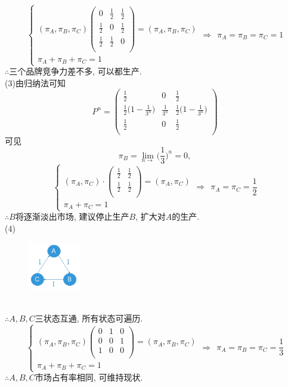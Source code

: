 \[
\begin{cases}
(\pi_A,\pi_B,\pi_C)
\begin{pmatrix}
0 & \frac{1}{2} & \frac{1}{2}\\
\frac{1}{2} & 0 & \frac{1}{2}\\
\frac{1}{2} & \frac{1}{2} & 0\\
\end{pmatrix}
=
(\pi_A,\pi_B,\pi_C)\\
\pi_A+\pi_B+\pi_C = 1
\end{cases}
\Rightarrow~~
\pi_A = \pi_B = \pi_C = 1
\]
$\therefore$三个品牌竞争力差不多, 可以都生产.\\
(3)由归纳法可知
\[
P^n=
\begin{pmatrix}
\frac{1}{2} & 0 & \frac{1}{2}\\
\frac{1}{2}\big(1-\frac{1}{3^n}\big) & \frac{1}{3^n} & \frac{1}{2}\big(1-\frac{1}{3^n}\big)\\
\frac{1}{2} & 0 & \frac{1}{2}\\
\end{pmatrix}
\]
可见
\[
\pi_B = \lim_{n\rightarrow} \Big(\frac{1}{3}\Big)^n = 0,
\]
\[
\begin{cases}
(\pi_A, \pi_C)\cdot 
	\begin{pmatrix}
	\frac{1}{2} & \frac{1}{2}\\
	\frac{1}{2} & \frac{1}{2}\\
	\end{pmatrix}	
=
(\pi_A, \pi_C)\\
\pi_A + \pi_C = 1
\end{cases}
\Rightarrow~~
\pi_A = \pi_C = \frac{1}{2}
\]
$\therefore B$将逐渐淡出市场, 建议停止生产$B$, 扩大对$A$的生产.\\
(4)
\begin{figure}[htbp]
		\centering
		\includegraphics[width=0.2\textwidth]{../resource/sp3_14_4.png}
\end{figure}\\
$\therefore A,B,C$三状态互通, 所有状态可遍历.\\
\[
\begin{cases}
(\pi_A,\pi_B,\pi_C)
\begin{pmatrix}
0 & 1 & 0\\
0 & 0 & 1\\
1 & 0 & 0\\
\end{pmatrix}
=
(\pi_A,\pi_B,\pi_C)\\
\pi_A+\pi_B+\pi_C = 1
\end{cases}
\Rightarrow~~
\pi_A = \pi_B = \pi_C = \frac{1}{3}
\]
$\therefore A,B,C$市场占有率相同, 可维持现状.\\


